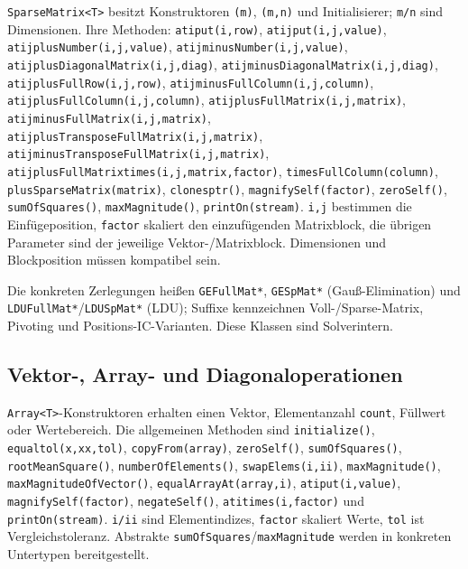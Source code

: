 \documentclass[
  12pt
]{book}
\begin{document}
\texttt{SparseMatrix\textless{}T\textgreater{}} besitzt Konstruktoren
\texttt{(m)}, \texttt{(m,n)} und Initialisierer; \texttt{m/n} sind
Dimensionen. Ihre Methoden: \texttt{atiput(i,row)},
\texttt{atijput(i,j,value)}, \texttt{atijplusNumber(i,j,value)},
\texttt{atijminusNumber(i,j,value)},
\texttt{atijplusDiagonalMatrix(i,j,diag)},
\texttt{atijminusDiagonalMatrix(i,j,diag)},
\texttt{atijplusFullRow(i,j,row)},
\texttt{atijminusFullColumn(i,j,column)},
\texttt{atijplusFullColumn(i,j,column)},
\texttt{atijplusFullMatrix(i,j,matrix)},
\texttt{atijminusFullMatrix(i,j,matrix)},
\texttt{atijplusTransposeFullMatrix(i,j,matrix)},
\texttt{atijminusTransposeFullMatrix(i,j,matrix)},
\texttt{atijplusFullMatrixtimes(i,j,matrix,factor)},
\texttt{timesFullColumn(column)}, \texttt{plusSparseMatrix(matrix)},
\texttt{clonesptr()}, \texttt{magnifySelf(factor)}, \texttt{zeroSelf()},
\texttt{sumOfSquares()}, \texttt{maxMagnitude()},
\texttt{printOn(stream)}. \texttt{i,j} bestimmen die Einfügeposition,
\texttt{factor} skaliert den einzufügenden Matrixblock, die übrigen
Parameter sind der jeweilige Vektor-/Matrixblock. Dimensionen und
Blockposition müssen kompatibel sein.

Die konkreten Zerlegungen heißen \texttt{GEFullMat*}, \texttt{GESpMat*}
(Gauß-Elimination) und \texttt{LDUFullMat*}/\texttt{LDUSpMat*} (LDU);
Suffixe kennzeichnen Voll-/Sparse-Matrix, Pivoting und
Positions-IC-Varianten. Diese Klassen sind Solverintern.

\hypertarget{vektor--array--und-diagonaloperationen}{%
\subsection*{Vektor-, Array- und
Diagonaloperationen}\label{vektor--array--und-diagonaloperationen}}

\texttt{Array\textless{}T\textgreater{}}-Konstruktoren erhalten einen
Vektor, Elementanzahl \texttt{count}, Füllwert oder Wertebereich. Die
allgemeinen Methoden sind \texttt{initialize()},
\texttt{equaltol(x,xx,tol)}, \texttt{copyFrom(array)},
\texttt{zeroSelf()}, \texttt{sumOfSquares()}, \texttt{rootMeanSquare()},
\texttt{numberOfElements()}, \texttt{swapElems(i,ii)},
\texttt{maxMagnitude()}, \texttt{maxMagnitudeOfVector()},
\texttt{equalArrayAt(array,i)}, \texttt{atiput(i,value)},
\texttt{magnifySelf(factor)}, \texttt{negateSelf()},
\texttt{atitimes(i,factor)} und \texttt{printOn(stream)}. \texttt{i/ii}
sind Elementindizes, \texttt{factor} skaliert Werte, \texttt{tol} ist
Vergleichstoleranz. Abstrakte
\texttt{sumOfSquares}/\texttt{maxMagnitude} werden in konkreten
Untertypen bereitgestellt.
\end{document}
